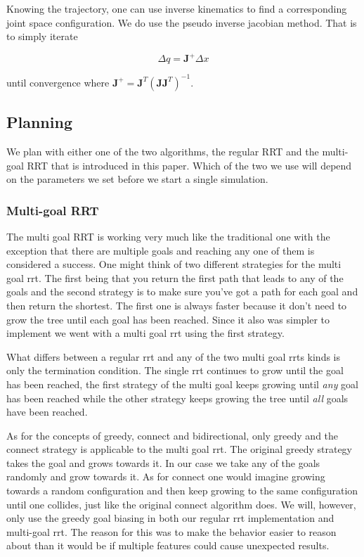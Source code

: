 \documentclass[letterpaper, 10 pt, conference]{ieeeconf}  %
\begin{document}
Knowing the trajectory, one can use inverse kinematics to find a corresponding
joint space configuration. We do use the pseudo inverse jacobian method.
That is to simply iterate

\[
  \Delta q = \mathbf{J}^{+} \Delta x
\]

until convergence where $\mathbf{J}^{+} =
\mathbf{J}^T(\mathbf{J}\mathbf{J}^T)^{-1}$.


\subsection{Planning}

We plan with either one of the two algorithms, the regular RRT
\cite{lavalle2001randomized} and the
multi-goal RRT that is introduced in this paper. Which of the two we use
will depend on the parameters we set before we start a single
simulation.

\subsubsection{Multi-goal RRT}

The multi goal RRT is working very much like the traditional one with
the exception that there are multiple goals and reaching any one of them
is considered a success. One might think of two different strategies for
the multi goal rrt. The first being that you return the first path that
leads to any of the goals and the second strategy is to make sure you've
got a path for each goal and then return the shortest. The first one is
always faster because it don't need to grow the tree until each goal has
been reached. Since it also was simpler to implement we went with a
multi goal rrt using the first strategy.

What differs between a regular rrt and any of the two multi goal rrts
kinds is only the termination condition. The single rrt continues to
grow until the goal has been reached, the first strategy of the multi
goal keeps growing until \emph{any} goal has been reached while the
other strategy keeps growing the tree until \emph{all} goals have been
reached.

As for the concepts of greedy, connect and bidirectional, only greedy and the
connect strategy is applicable to the multi goal rrt. The original greedy
strategy takes the goal and grows towards it\cite{robocup, FergusonKS06}. In
our case we take any of the goals randomly and grow towards it. As for connect
one would imagine growing towards a random configuration and then keep growing
to the same configuration until one collides, just like the original connect
algorithm does\cite{kuffner2000rrt}. We will, however, only use the greedy goal
biasing in both our regular rrt implementation and multi-goal rrt. The reason
for this was to make the behavior easier to reason about than it would be if
multiple features could cause unexpected results.
\end{document}
